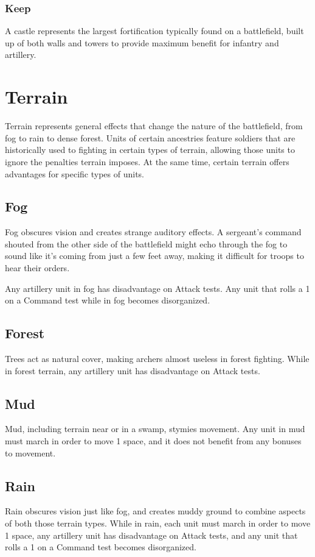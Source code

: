 \documentclass[10pt,a4paper,twoside,bg=print,twocolumn,openany,nodeprecatedcode]{dndbook}
\begin{document}
\subsubsection{Keep}
A castle represents the largest fortification typically found on a battlefield, built up of both walls and towers to provide maximum benefit for infantry and artillery.

\section{Terrain}
Terrain represents general effects that change the nature of the battlefield, from fog to rain to dense forest. Units of certain ancestries feature soldiers that are historically used to fighting in certain types of terrain, allowing those units to ignore the penalties terrain imposes. At the same time, certain terrain offers advantages for specific types of units.

\subsection{Fog}
Fog obscures vision and creates strange auditory effects. A sergeant's command shouted from the other side of the battlefield might echo through the fog to sound like it's coming from just a few feet away, making it difficult for troops to hear their orders.

Any artillery unit in fog has disadvantage on Attack tests. Any unit that rolls a 1 on a Command test while in fog becomes disorganized.

\subsection{Forest}
Trees act as natural cover, making archers almost useless in forest fighting. While in forest terrain, any artillery unit has disadvantage on Attack tests.

\subsection{Mud}
Mud, including terrain near or in a swamp, stymies movement. Any unit in mud must march in order to move 1 space, and it does not benefit from any bonuses to movement.

\subsection{Rain}
Rain obscures vision just like fog, and creates muddy ground to combine aspects of both those terrain types. While in rain, each unit must march in order to move 1 space, any artillery unit has disadvantage on Attack tests, and any unit that rolls a 1 on a Command test becomes disorganized.
\end{document}
